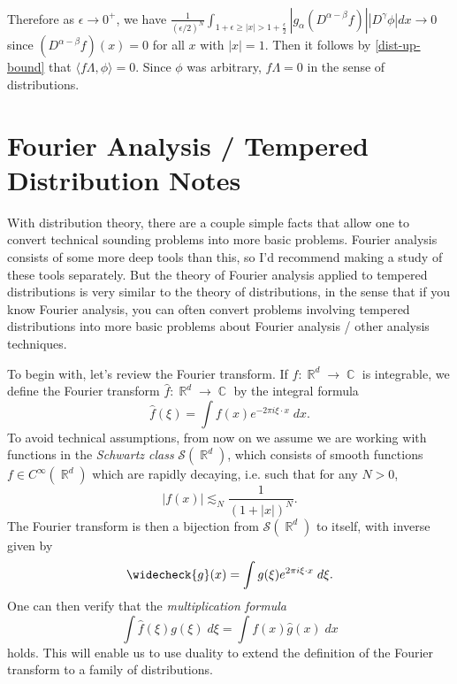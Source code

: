 \documentclass[answers]{exam}
\DeclareMathOperator{\CC}{\mathbb{C}}
\DeclareMathOperator{\RR}{\mathbb{R}}
\theoremstyle{problemstyle}
\newcommand{\1}[1]{\textbf{1}_{\left[#1\right]}} %
\begin{document}
\begin{questions}
\begin{parts}
\begin{solution}
\begin{align*}
    \end{align*}
    Therefore as $\epsilon\to 0^+$, we have $\frac{1}{(\epsilon/2)^N}\int_{1+ \epsilon\geq |x|>1+\frac{\epsilon}{2}} \left| g_{\alpha}(D^{\alpha-\beta}f)\right| \left| D^{\gamma}\phi \right|dx \to 0$ since $(D^{\alpha-\beta}f)(x)=0$ for all $x$ with $|x|=1$. Then it follows by \eqref{dist-up-bound} that $\langle f\Lambda, \phi\rangle = 0$. Since $\phi$ was arbitrary, $f\Lambda=0$ in the sense of distributions.
  \end{solution}
\end{parts}













\newpage
\section{Fourier Analysis / Tempered Distribution Notes}

With distribution theory, there are a couple simple facts that allow one to convert technical sounding problems into more basic problems. Fourier analysis consists of some more deep tools than this, so I'd recommend making a study of these tools separately. But the theory of Fourier analysis applied to tempered distributions is very similar to the theory of distributions, in the sense that if you know Fourier analysis, you can often convert problems involving tempered distributions into more basic problems about Fourier analysis / other analysis techniques.

To begin with, let's review the Fourier transform. If $f: \RR^d \to \CC$ is integrable, we define the Fourier transform $\widehat{f}: \RR^d \to \CC$ by the integral formula
%
\[ \widehat{f}(\xi) = \int f(x) e^{-2 \pi i \xi \cdot x}\; dx. \]
%
To avoid technical assumptions, from now on we assume we are working with functions in the \emph{Schwartz class} $\mathcal{S}(\RR^d)$, which consists of smooth functions $f \in C^\infty(\RR^d)$ which are rapidly decaying, i.e. such that for any $N > 0$,
%
\[ |f(x)| \lesssim_N \frac{1}{(1 + |x|)^N}. \]
%
The Fourier transform is then a bijection from $\mathcal{S}(\RR^d)$ to itself, with inverse given by
%
\[ \widecheck{g}(x) = \int g(\xi) e^{2 \pi i \xi \cdot x}\; d \xi. \]
%
One can then verify that the \emph{multiplication formula}
%
\[ \int \widehat{f}(\xi) g(\xi)\; d\xi = \int f(x) \widehat{g}(x)\; dx \]
%
holds. This will enable us to use duality to extend the definition of the Fourier transform to a family of distributions.


\end{questions}
\end{document}
